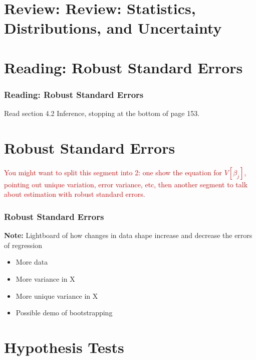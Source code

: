 \documentclass[12pt, block=fill]{beamer}
\newcommand{\paul}[1]{\textcolor{red}{#1}}
\begin{document}
\section{Review: Review: Statistics, Distributions, and Uncertainty}

\section{Reading: Robust Standard Errors}

\begin{frame}
  \frametitle{Reading: Robust Standard Errors}
  Read section 4.2 Inference, stopping at the bottom of page 153.
\end{frame}


\section{Robust Standard Errors}

\begin{frame}
 \paul{You might want to split this segment into 2: one show the equation for $V[\beta_j]$, pointing out unique variation, error variance, etc, then another segment to talk about estimation with robust standard errors.}
\end{frame}


\begin{frame}
  \frametitle{Robust Standard Errors} 
  

  
  \textbf{Note:} Lightboard of how changes in data shape increase and decrease the
  errors of regression
  \begin{itemize}
  \item More data
  \item More variance in X
  \item More unique variance in X
  \item Possible demo of bootstrapping
  \end{itemize} 


\end{frame}




\section{Hypothesis Tests}
\end{document}
